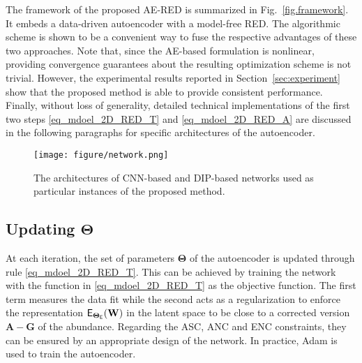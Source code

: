 \documentclass[journal,a4paper]{IEEEtran}
\newcommand{\bTheta}{\boldsymbol{\Theta}}
\newcommand{\MATabund}{\mathbf{A}}
\begin{document}
The framework of the proposed AE-RED is summarized in Fig.~\ref{fig.framework}. It embeds a data-driven autoencoder with a model-free RED. The algorithmic scheme is shown to be a convenient way to fuse the respective advantages of these two approaches. Note that, since the AE-based formulation is nonlinear, providing convergence guarantees about the resulting optimization scheme is not trivial. However, the experimental results reported in Section~\ref{sec:experiment} show that the proposed method is able to provide consistent performance. Finally, without loss of generality, detailed technical implementations of the first two steps \eqref{eq_mdoel_2D_RED_T} and \eqref{eq_mdoel_2D_RED_A} are discussed in the following paragraphs for specific architectures of the autoencoder.

\begin{figure*}[!t]
  \centering
  \texttt{[image: figure/network.png]}\\
  \caption{The architectures of CNN-based and DIP-based networks used as particular instances of the proposed method. }\label{fig.network}
\end{figure*}


\subsection{Updating $\boldsymbol{\Theta}$}
\label{sec:proposed-B}
At each iteration, the set of parameters $\boldsymbol{\Theta}$ of the autoencoder is updated through rule \eqref{eq_mdoel_2D_RED_T}. This can be achieved by training the network with the function in \eqref{eq_mdoel_2D_RED_T} as the objective function. The first term measures the data fit while the second acts as a regularization to enforce the representation  $\mathsf{E}_{\bTheta_{\sf E}}(\mathbf{W})$ in the latent space to be close to a corrected version $\MATabund-\mathbf{G}$ of the abundance. %
Regarding the ASC, ANC and ENC constraints, they can be ensured by an appropriate design of the network. In practice, Adam is used to train the autoencoder.
\end{document}
